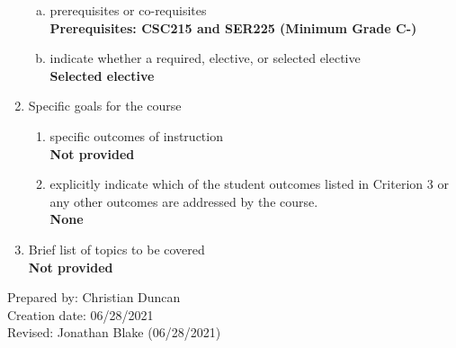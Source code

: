 \begin{enumerate}[1.]
\begin{enumerate}[a.]
\item prerequisites or co-requisites\\
  {\bfseries
    Prerequisites: CSC215 and SER225 (Minimum Grade C-)
  }

\item indicate whether a required, elective, or selected elective\\ %
  {\bfseries
    Selected elective
  }

\end{enumerate}

\item Specific goals for the course
\begin{enumerate}
\item specific outcomes of instruction\\ %
  {\bfseries
    Not provided
  }

\item explicitly indicate which of the student outcomes listed in Criterion 3 or any other outcomes are addressed by the course.\\
  {\bfseries
    None
  }
\end{enumerate}

\item Brief list of topics to be covered\\
  {\bfseries
    Not provided
  }

\end{enumerate}

\noindent Prepared by: Christian Duncan\\
\noindent Creation date: 06/28/2021\\
\noindent Revised: Jonathan Blake (06/28/2021)\\

